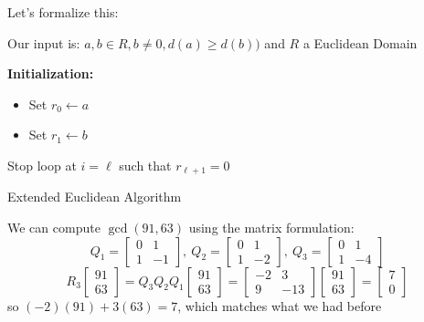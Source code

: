 Let's formalize this:

\IncMargin{1em}
\begin{algorithm}[H]
    Our input is: $a,b \in R, b \neq 0, d(a) \geq d(b))$ and $R$ a Euclidean Domain

    \nl \textbf{Initialization:}
    \begin{itemize}
        \item Set $r_0 \leftarrow a$
        \item Set $r_1 \leftarrow b$
    \end{itemize}

    \nl {}
    
    \nl Stop loop at $i = \ell$ such that $r_{\ell + 1} = 0$

    \caption{Extended Euclidean Algorithm}
\end{algorithm}

\begin{example}
    We can compute $\gcd(91,63)$ using the matrix formulation:
    \[
    Q_1 =
    \begin{bmatrix}
        0 & 1\\
        1 & -1
    \end{bmatrix}, \
    Q_2 =
    \begin{bmatrix}
        0 & 1\\
        1 & -2
    \end{bmatrix}, \
    Q_3 =
    \begin{bmatrix}
        0 & 1\\
        1 & -4
    \end{bmatrix}
    \]
    \[
    R_3 
    \begin{bmatrix}
        91 \\ 63
    \end{bmatrix} 
    = 
    Q_3Q_2Q_1
    \begin{bmatrix}
        91 \\ 63
    \end{bmatrix}
    = 
    \begin{bmatrix}
        -2 & 3\\
        9 & -13
    \end{bmatrix}
    \begin{bmatrix}
        91 \\ 63
    \end{bmatrix}
    =
    \begin{bmatrix}
        7 \\ 0
    \end{bmatrix}
    \]
    so $(-2)(91) + 3(63) = 7$, which matches what we had before
\end{example}

